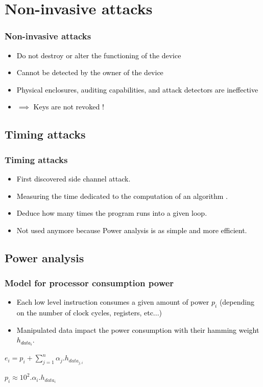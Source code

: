 \documentclass{beamer}
\begin{document}
\section{Non-invasive attacks}

\begin{frame}
    \frametitle{Non-invasive attacks}
    \begin{itemize}
        \item \textcolor{black} {Do not destroy or alter the functioning of the device}
        \item \textcolor{black} {Cannot be detected by the owner of the device}
	\item \textcolor{black} {Physical enclosures, auditing capabilities, and attack detectors are ineffective}
	\item \textcolor{black} {$\implies$ Keys are not revoked !}
    \end{itemize}

\end{frame}

    \subsection{Timing attacks}

\begin{frame}
    \frametitle{Timing attacks}
    \begin{itemize}
        \item \textcolor{black} {First discovered side channel attack.}
        \item \textcolor{black} {Measuring the time dedicated to the computation of an algorithm .} 
	\item \textcolor{black} {Deduce how many times the program runs into a given loop.} 
	\item \textcolor{black} {Not used anymore because Power analysis is as simple and more efficient.} 
    \end{itemize}
\end{frame}


    \subsection{Power analysis}

\begin{frame}
    \frametitle{Model for processor consumption power}
    \begin{itemize}
        \item \textcolor{black} {Each low level instruction consumes a given amount of power $p_{i}$ (depending on the number of clock cycles, registers, etc...)}
        \item \textcolor{black} {Manipulated data impact the power consumption with their hamming weight $h_{data_{i}}$.} 
    \end{itemize}
\begin{center}
    $ e_{i} = p_{i} + \sum_{j=1}^{n} \alpha_{j}. h_{data_{j,i}}$\\
\end{center} 

    $ p_{i} \approx 10^{2}.\alpha_{i}. h_{data_{i}}$\\
\end{frame}
\end{document}
